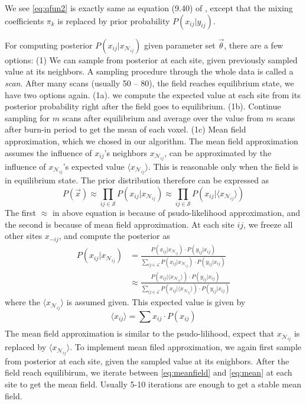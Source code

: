 \documentclass[12pt]{article}
\begin{document}
We see \eqref{eq:qfun2} is exactly same as equation (9.40) of \citet[ch. 9]{bishop2006pattern}, except that the mixing coefficients $\pi_k$ is replaced by prior probability $P(x_{ij} | y_{ij})$. 


For computing posterior $P(x_{ij} | x_{\mathcal{N}_{ij}})$ given
parameter set $\vec \theta$, there are a few options: (1) We can
sample from posterior at each site, given previously sampled value at
its neighbors. A sampling procedure through the whole data is called a
\emph{scan}. After many scans (usually 50 -- 80), the field reaches
equilibrium state, we have two options again. (1a). we compute the
expected value at each site from its posterior probability right after
the field goes to equilibrium. (1b).  Continue sampling for $m$ scans
after equilibrium and average over the value from $m$ scans after
burn-in period to get the mean of each voxel. (1c) Mean field
approximation, which we chosed in our algorithm. The mean field
approximation assumes the influence of $x_{ij}$'s neighbors
$x_{\mathcal{N}_{ij}}$, can be approximated by the influence of
$x_{\mathcal{N}_{ij}}$'s expected value $\langle x_{\mathcal{N}_{ij}}
\rangle$.  This is reasonable only when the field is in equilibrium
state. The prior distribution therefore can be expressed as
\begin{equation*} 
  P(\vec x) \approx \prod_{ij \in \mathcal{S}} P(x_{ij} | x_{\mathcal{N}_{ij}}) \approx \prod_{ij \in \mathcal{S}} P(x_{ij} | \langle x_{\mathcal{N}_{ij}} \rangle)
\end{equation*}
The first $\approx$ in above equation is because of psudo-likelihood
approximation, and the second is because of mean field
approximation. At each site $ij$, we freeze all other sites $x_{-ij}$,
and compute the posterior as
\begin{align}
  P(x_{ij} | x_{\mathcal{N}_{ij}}) &= \frac{P(x_{ij} | x_{\mathcal{N}_{ij}})\cdot P(y_{ij} | x_{ij})}{\sum_{ij \in \mathcal{L}}P(x_{ij} | x_{\mathcal{N}_{ij}})\cdot P(y_{ij} | x_{ij})} \label{eq:localcond}\\
  &\approx \frac{P(x_{ij} | \langle x_{\mathcal{N}_{ij}} \rangle ) \cdot P(y_{ij} | x_{ij})}{\sum_{ij \in \mathcal{L}}P(x_{ij} |\langle x_{\mathcal{N}_{ij}} \rangle )\cdot P(y_{ij} | x_{ij})} \label{eq:meanfield}
\end{align}
where the $\langle x_{\mathcal{N}_{ij}} \rangle $ is assumed given. This expected value is given by 
\begin{equation}
  \langle x_{ij} \rangle = \sum_{} x_{ij} \cdot P(x_{ij}) \label{eq:mean}
\end{equation}
The mean field approximation is similar to the psudo-lilihood, expect
that $x_{\mathcal{N}_{ij}}$ is replaced by $\langle
x_{\mathcal{N}_{ij}} \rangle $. To implement mean filed approximation,
we again first sample from posterior at each site, given the sampled
value at its enighbors. After the field reach equilibirum, we iterate
between \eqref{eq:meanfield} and \eqref{eq:mean} at each site to get
the mean field. Usually 5-10 iterations are enough to get a stable mean field.
\end{document}
